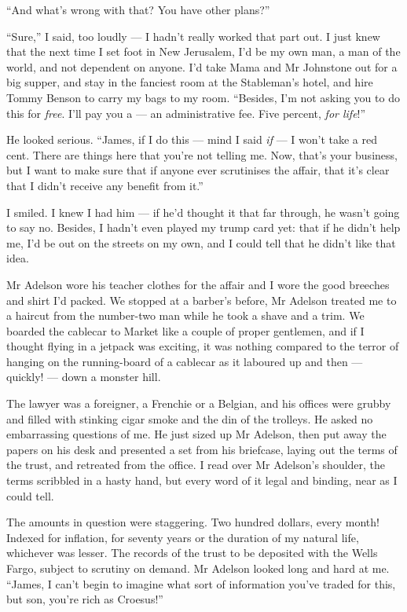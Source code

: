 ``And what's wrong with that? You have other plans?''

``Sure,'' I said, too loudly --- I hadn't really worked that part
out. I just knew that the next time I set foot in New Jerusalem,
I'd be my own man, a man of the world, and not dependent on anyone.
I'd take Mama and Mr Johnstone out for a big supper, and stay in
the fanciest room at the Stableman's hotel, and hire Tommy Benson
to carry my bags to my room.
``Besides, I'm not asking you to do this for \emph{free}. I'll pay you a --- an 
administrative fee. Five percent, \emph{for life}!''

He looked serious.
``James, if I do this --- mind I said \emph{if} --- I won't take a red cent. 
There are things here that you're not telling me. Now, that's your business, 
but I want to make sure that if anyone ever scrutinises the affair, that it's 
clear that I didn't receive any benefit from it.''

I smiled. I knew I had him --- if he'd thought it that far through,
he wasn't going to say no. Besides, I hadn't even played my trump
card yet: that if he didn't help me, I'd be out on the streets on
my own, and I could tell that he didn't like that idea.

\tb

Mr Adelson wore his teacher clothes for the affair and I wore the
good breeches and shirt I'd packed. We stopped at a barber's
before, Mr Adelson treated me to a haircut from the number-two man
while he took a shave and a trim. We boarded the cablecar to Market
like a couple of proper gentlemen, and if I thought flying in a
jetpack was exciting, it was nothing compared to the terror of
hanging on the running-board of a cablecar as it laboured up and
then --- quickly! --- down a monster hill.

The lawyer was a foreigner, a Frenchie or a Belgian, and his
offices were grubby and filled with stinking cigar smoke and the
din of the trolleys. He asked no embarrassing questions of me. He
just sized up Mr Adelson, then put away the papers on his desk and
presented a set from his briefcase, laying out the terms of the
trust, and retreated from the office. I read over Mr Adelson's
shoulder, the terms scribbled in a hasty hand, but every word of it
legal and binding, near as I could tell.

The amounts in question were staggering. Two hundred dollars, every
month! Indexed for inflation, for seventy years or the duration of
my natural life, whichever was lesser. The records of the trust to
be deposited with the Wells Fargo, subject to scrutiny on demand.
Mr Adelson looked long and hard at me.
``James, I can't begin to imagine what sort of information you've traded for 
this, but son, you're rich as Croesus!''

